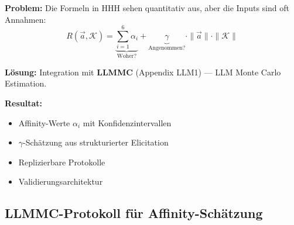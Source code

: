 \begin{tcolorbox}[colback=blue!5!white, colframe=blue!75!black,
    title=\textbf{Das Quantifizierungsproblem --- und seine Lösung}]

\textbf{Problem:} Die Formeln in HHH sehen quantitativ aus, aber die Inputs sind oft Annahmen:
\begin{equation*}
R(\vec{a}, \mathcal{K}) = \underbrace{\sum_{i=1}^{6} \alpha_i}_{\text{Woher?}} + \underbrace{\gamma}_{\text{Angenommen?}} \cdot \|\vec{a}\| \cdot \|\mathcal{K}\|
\end{equation*}

\textbf{Lösung:} Integration mit \textbf{LLMMC} (Appendix LLM1) --- LLM Monte Carlo Estimation.

\textbf{Resultat:}
\begin{itemize}[nosep]
    \item Affinity-Werte $\alpha_i$ mit Konfidenzintervallen
    \item $\gamma$-Schätzung aus strukturierter Elicitation
    \item Replizierbare Protokolle
    \item Validierungsarchitektur
\end{itemize}

\end{tcolorbox}

\subsection{LLMMC-Protokoll für Affinity-Schätzung}


